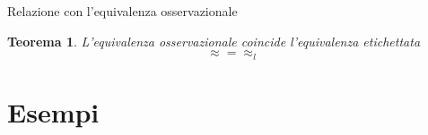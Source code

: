 \documentclass{beamer}
\newcounter{counter1}
\theoremstyle{plain}
\newtheorem{myteo}[counter1]{Teorema}
\theoremstyle{definition}
\theoremstyle{remark}
\begin{document}
\begin{frame}{Relazione con l'equivalenza osservazionale}
  \begin{myteo}
    L'equivalenza osservazionale coincide l'equivalenza etichettata
    \[ \approx = \approx _l \]
  \end{myteo}
\end{frame}

\section{Esempi}

\begin{frame}
  
\end{frame}
\end{document}
